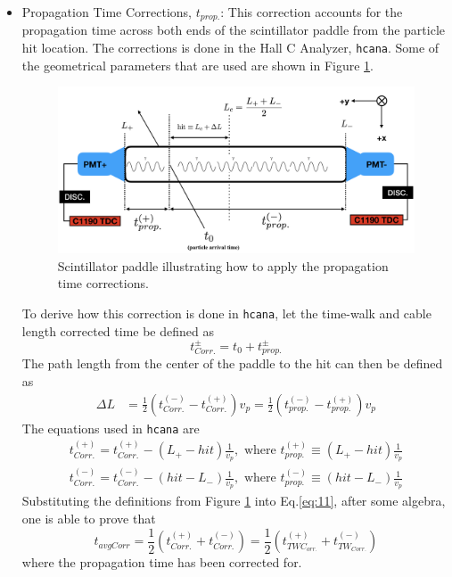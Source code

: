\documentclass[14pt]{article}
\begin{document}
\begin{itemize}
\item Propagation Time Corrections, $t_{prop.}$: This correction accounts for the propagation
  time across both ends of the scintillator paddle from the particle hit location. The corrections is
  done in the Hall C Analyzer, \texttt{hcana}. Some of the geometrical parameters that are used are shown
  in Figure \ref{fig:propTime}. \\
  \begin{figure}[H]
    \captionsetup{justification=raggedright,singlelinecheck=false}
    \includegraphics[scale=0.48]{propTime_Corr.png}
    \caption{Scintillator paddle illustrating how to apply the propagation time corrections.}
    \label{fig:propTime}
  \end{figure}
  To derive how this correction is done in \texttt{hcana}, let the time-walk and cable length corrected time be
  defined as
  \begin{equation}
    t^{\pm}_{Corr.} = t_{0} + t^{\pm}_{prop.}
  \end{equation}
  The path length from the center of the paddle to the hit can then be defined as
    \begin{align}
      \Delta L &= \frac{1}{2}(t^{(-)}_{Corr.} - t^{(+)}_{Corr.})v_{p} =  \frac{1}{2}(t^{(-)}_{prop.} - t^{(+)}_{prop.})v_{p}
    \end{align}
    The equations used in \texttt{hcana} are
    \begin{align}\label{eq:11}
      t^{(+)}_{Corr.} = t^{(+)}_{Corr.} - (L_{+} - hit)\frac{1}{v_{p}}, \text{ where } t^{(+)}_{prop.}\equiv(L_{+} - hit)\frac{1}{v_{p}} \nonumber \\
      t^{(-)}_{Corr.} = t^{(-)}_{Corr.} - (hit - L_{-})\frac{1}{v_{p}}, \text{ where } t^{(-)}_{prop.}\equiv(hit - L_{-})\frac{1}{v_{p}}       
    \end{align}
    Substituting the definitions from Figure \ref{fig:propTime}  into Eq.\ref{eq:11}, after some algebra, one is able to prove that
    \begin{equation}
      t_{avgCorr} = \frac{1}{2}( t^{(+)}_{Corr.} +  t^{(-)}_{Corr.}) = \frac{1}{2} (t^{(+)}_{TWC_{orr.}} +  t^{(-)}_{TW_{Corr.}})
    \end{equation}
    where the propagation time has been corrected for.
\end{itemize}
\end{document}

